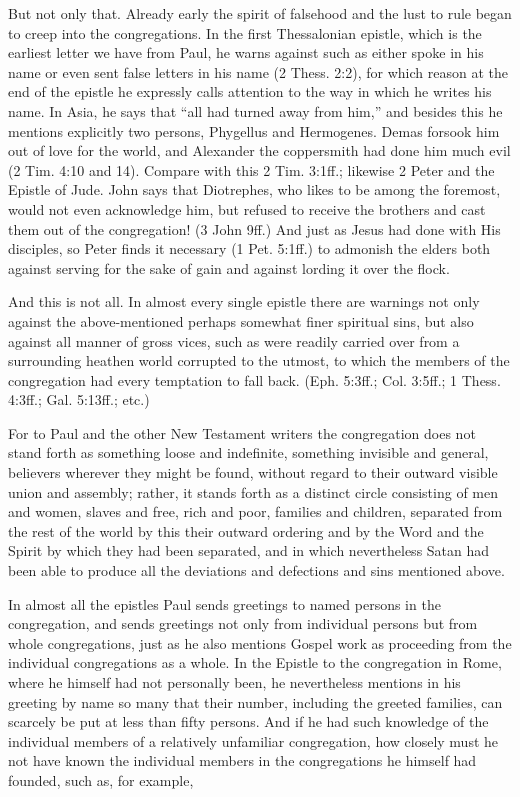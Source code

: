 But not only that. Already early the spirit of falsehood and the lust to rule began to creep into the congregations. In the first Thessalonian epistle, which is the earliest letter we have from Paul, he warns against such as either spoke in his name or even sent false letters in his name (2 Thess. 2:2), for which reason at the end of the epistle he expressly calls attention to the way in which he writes his name. In Asia, he says that “all had turned away from him,” and besides this he mentions explicitly two persons, Phygellus and Hermogenes. Demas forsook him out of love for the world, and Alexander the coppersmith had done him much evil (2 Tim. 4:10 and 14). Compare with this 2 Tim. 3:1ff.; likewise 2 Peter and the Epistle of Jude. John says that Diotrephes, who likes to be among the foremost, would not even acknowledge him, but refused to receive the brothers and cast them out of the congregation! (3 John 9ff.) And just as Jesus had done with His disciples, so Peter finds it necessary (1 Pet. 5:1ff.) to admonish the elders both against serving for the sake of gain and against lording it over the flock.

And this is not all. In almost every single epistle there are warnings not only against the above-mentioned perhaps somewhat finer spiritual sins, but also against all manner of gross vices, such as were readily carried over from a surrounding heathen world corrupted to the utmost, to which the members of the congregation had every temptation to fall back. (Eph. 5:3ff.; Col. 3:5ff.; 1 Thess. 4:3ff.; Gal. 5:13ff.; etc.)

For to Paul and the other New Testament writers the congregation does not stand forth as something loose and indefinite, something invisible and general, believers wherever they might be found, without regard to their outward visible union and assembly; rather, it stands forth as a distinct circle consisting of men and women, slaves and free, rich and poor, families and children, separated from the rest of the world by this their outward ordering and by the Word and the Spirit by which they had been separated, and in which nevertheless Satan had been able to produce all the deviations and defections and sins mentioned above.

In almost all the epistles Paul sends greetings to named persons in the congregation, and sends greetings not only from individual persons but from whole congregations, just as he also mentions Gospel work as proceeding from the individual congregations as a whole. In the Epistle to the congregation in Rome, where he himself had not personally been, he nevertheless mentions in his greeting by name so many that their number, including the greeted families, can scarcely be put at less than fifty persons. And if he had such knowledge of the individual members of a relatively unfamiliar congregation, how closely must he not have known the individual members in the congregations he himself had founded, such as, for example,

